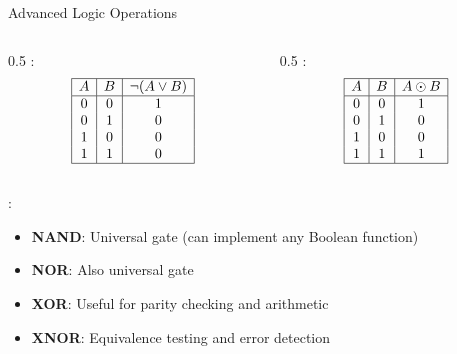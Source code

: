 \begin{frame}{Advanced Logic Operations}
\begin{columns}
\begin{column}{0.5\textwidth}
:
\[
\begin{array}{|c|c|c|}
\hline
A & B & \neg(A \lor B) \\
\hline
0 & 0 & 1 \\
0 & 1 & 0 \\
1 & 0 & 0 \\
1 & 1 & 0 \\
\hline
\end{array}
\]
\end{column}
\begin{column}{0.5\textwidth}
:
\[
\begin{array}{|c|c|c|}
\hline
A & B & A \odot B \\
\hline
0 & 0 & 1 \\
0 & 1 & 0 \\
1 & 0 & 0 \\
1 & 1 & 1 \\
\hline
\end{array}
\]
\end{column}
\end{columns}

\vspace{0.5cm}
:
\begin{itemize}
\item \textbf{NAND}: Universal gate (can implement any Boolean function)
\item \textbf{NOR}: Also universal gate
\item \textbf{XOR}: Useful for parity checking and arithmetic
\item \textbf{XNOR}: Equivalence testing and error detection
\end{itemize}
\end{frame}

